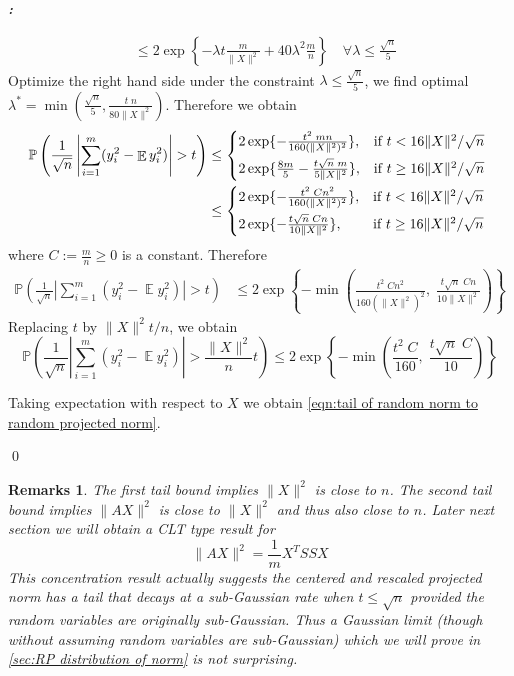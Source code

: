 \documentclass[12pt]{extarticle}
\newtheorem*{remark*}{Remarks}
\renewenvironment{proof}[1][\proofname]{ { \it\bfseries #1: }}{\qed}
\newcommand{\field}[1]{\mathbb{#1}}
\newcommand{\1}{\field{1}}
\newcommand{\p}{\field{P}}
\DeclareMathOperator{\E}{\mathbb{E}}
\numberwithin{equation}{section}
\begin{document}
\begin{proof}
\begin{enumerate}
\begin{align*}
    & \le 2  \exp \left\{ -\lambda t\frac{m}{\|X\|^2} + 40\lambda^2 \frac{m}{n}  \right\} \quad \forall \lambda \le \frac{\sqrt{n}}{5}
 \end{align*}
Optimize the right hand  side under the constraint  $\lambda \le \frac{\sqrt{n}}{5}$, we  find optimal $\lambda^*= \min(\frac{\sqrt{n}}{5}, \frac{t \;n}{80\|X\|^2})$.
Therefore we obtain
\begin{align*}
\p \left( \frac{1}{\sqrt{n}} \left|  \sum_{i=1}^m (y_i^2 - \E y_i^2)\right|> t  \right) & \le 
    \begin{cases*}
    2\exp\{ {- \frac{t^2 \; mn}{160(\|X\|^2)^2} }  \},  & if $t < 16\|X\|^2/\sqrt{n}$  \\
    2\exp\{ { \frac{8m}{5}-\frac{t\sqrt{n} \; m}{5 \|X\|^2} }  \} ,   & if $t\ge 16\|X\|^2/\sqrt{n}$
    \end{cases*}  \\ 
    & \le 
    \begin{cases*}
    2\exp\{ {- \frac{t^2 \; Cn^2}{160(\|X\|^2)^2} }  \},  & if $t < 16\|X\|^2/\sqrt{n}$  \\
    2\exp\{ -\frac{t\sqrt{n} \; Cn}{10 \|X\|^2}   \} ,   & if $t\ge 16\|X\|^2/\sqrt{n}$
    \end{cases*}  
\end{align*}
where $C:=\frac{m}{n} \ge 0$ is a constant.
Therefore 
\begin{align*} 
\p \left( \frac{1}{\sqrt{n}} \left|  \sum_{i=1}^m (y_i^2 - \E y_i^2)\right|> t  \right) & \le 2\exp \left\{ -\min \left(   \frac{t^2 \; Cn^2}{160(\|X\|^2)^2} , \; { \frac{t\sqrt{n} \; Cn}{10 \|X\|^2} }  \right) \right\}
\end{align*}
Replacing $t$ by $\|X\|^2t/n$, we obtain 
\begin{equation*}
   \p \left(  \frac{1}{\sqrt{n}}\left|  \sum_{i=1}^m (y_i^2 - \E y_i^2)\right|> \frac{\|X\|^2 }{n} t  \right) 
   \le 2 \exp \left\{ -\min \left(   \frac{t^2 \; C}{160} , \; { \frac{t \sqrt{n}\; C}{10} }  \right) \right\}
\end{equation*}

Taking expectation with respect to $X$ we obtain \cref{eqn:tail of random norm to random projected norm}.


\end{enumerate}
\end{proof}

\begin{remark*}
The first tail bound implies $\|X\|^2$ is close to $n$. The second tail bound implies $\|AX\|^2$ is close to $\|X\|^2$ and thus also close to $n$. Later next section we will obtain a CLT type result for
\[
   \|AX\|^2  =\frac{1}{m} X^TSSX 
\]
  This concentration result actually suggests the centered and rescaled projected norm has a tail that decays at a sub-Gaussian rate when $t\le \sqrt{n}$ provided the random variables are originally sub-Gaussian. Thus a Gaussian limit (though without assuming random variables are sub-Gaussian) which we will prove in \cref{sec:RP  distribution of norm} is not surprising.
\end{remark*} 
\end{document}

